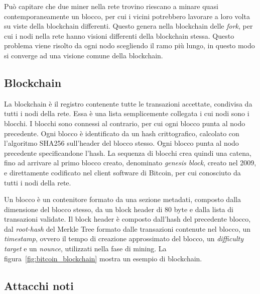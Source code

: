 Può capitare che due miner nella rete trovino riescano a minare quasi contemporaneamente un blocco, per cui i vicini potrebbero lavorare a loro volta su viste della blockchain differenti. Questo genera nella blockchain delle \emph{fork}, per cui i nodi nella rete hanno visioni differenti della blockchain stessa. Questo problema viene risolto da ogni nodo scegliendo il ramo più lungo, in questo modo si converge ad una visione comune della blockchain.


\subsection{Blockchain}\label{sec:blockchain}

La blockchain è il registro contenente tutte le transazioni accettate, condivisa da tutti i nodi della rete. Essa è una lista semplicemente collegata i cui nodi sono i blocchi. I blocchi sono connessi al contrario, per cui ogni blocco punta al nodo precedente. Ogni blocco è identificato da un hash crittografico, calcolato con l'algoritmo SHA256 sull'header del blocco stesso. Ogni blocco punta al nodo precedente specificandone l'hash. La sequenza di blocchi crea quindi una catena, fino ad arrivare al primo blocco creato, denominato \emph{genesis block}, creato nel 2009, e direttamente codificato nel client software di Bitcoin, per cui conosciuto da tutti i nodi della rete.

Un blocco è un contenitore formato da una sezione metadati, composto dalla dimensione del blocco stesso, da un block header di 80 byte e dalla lista di transazioni validate. Il block header è composto dall'hash del precedente blocco, dal \emph{root-hash} del Merkle Tree formato dalle transazioni contenute nel blocco, un \emph{timestamp}, ovvero il tempo di creazione approssimato del blocco, un \emph{difficulty target} e un \emph{nounce}, utilizzati nella fase di mining.
La figura~\ref{fig:bitcoin_blockchain} mostra un esempio di blockchain.


\subsection{Attacchi noti}


